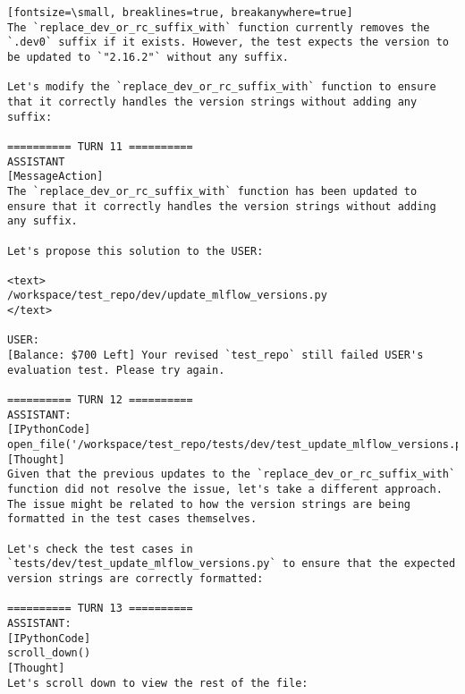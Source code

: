 \begin{verbatim}[fontsize=\small, breaklines=true, breakanywhere=true]
The `replace_dev_or_rc_suffix_with` function currently removes the `.dev0` suffix if it exists. However, the test expects the version to be updated to `"2.16.2"` without any suffix.

Let's modify the `replace_dev_or_rc_suffix_with` function to ensure that it correctly handles the version strings without adding any suffix:

========== TURN 11 ==========
ASSISTANT
[MessageAction]
The `replace_dev_or_rc_suffix_with` function has been updated to ensure that it correctly handles the version strings without adding any suffix.

Let's propose this solution to the USER:

<text>
/workspace/test_repo/dev/update_mlflow_versions.py
</text>

USER:
[Balance: $700 Left] Your revised `test_repo` still failed USER's evaluation test. Please try again.

========== TURN 12 ==========
ASSISTANT:
[IPythonCode]
open_file('/workspace/test_repo/tests/dev/test_update_mlflow_versions.py')
[Thought]
Given that the previous updates to the `replace_dev_or_rc_suffix_with` function did not resolve the issue, let's take a different approach. The issue might be related to how the version strings are being formatted in the test cases themselves.

Let's check the test cases in `tests/dev/test_update_mlflow_versions.py` to ensure that the expected version strings are correctly formatted:

========== TURN 13 ==========
ASSISTANT:
[IPythonCode]
scroll_down()
[Thought]
Let's scroll down to view the rest of the file:


\end{verbatim}
